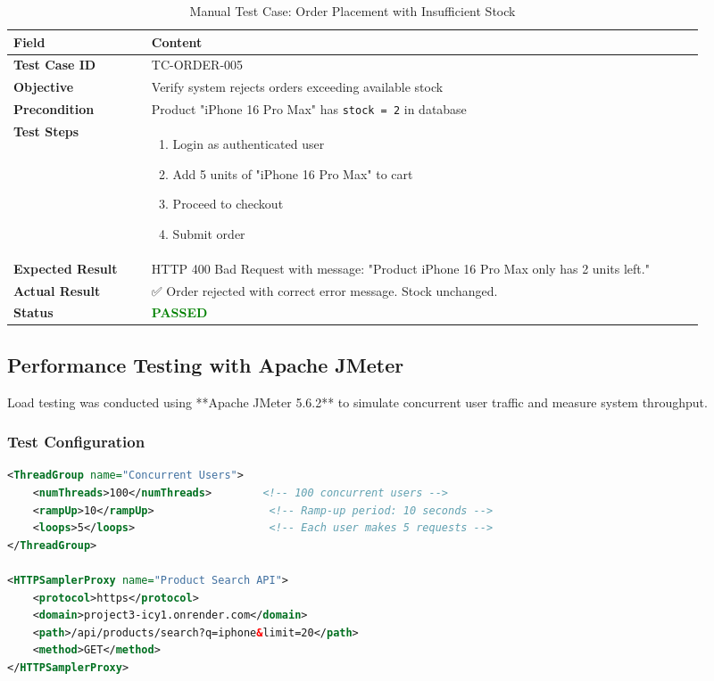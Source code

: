 \begin{table}[H]
\centering
\caption{Manual Test Case: Order Placement with Insufficient Stock}
\label{tab:test_stock}
\small
\begin{tabular}{@{}p{0.18\linewidth}p{0.72\linewidth}@{}}
\toprule
\textbf{Field} & \textbf{Content} \\
\midrule
\textbf{Test Case ID} & TC-ORDER-005 \\
\textbf{Objective} & Verify system rejects orders exceeding available stock \\
\textbf{Precondition} & Product "iPhone 16 Pro Max" has \texttt{stock = 2} in database \\
\textbf{Test Steps} & 
\begin{minipage}[t]{\linewidth}
\begin{enumerate}[nosep,leftmargin=*]
    \item Login as authenticated user
    \item Add 5 units of "iPhone 16 Pro Max" to cart
    \item Proceed to checkout
    \item Submit order
\end{enumerate}
\end{minipage} \\
\textbf{Expected Result} & HTTP 400 Bad Request with message: "Product iPhone 16 Pro Max only has 2 units left." \\
\textbf{Actual Result} & ✅ Order rejected with correct error message. Stock unchanged. \\
\textbf{Status} & \textcolor{green}{\textbf{PASSED}} \\
\bottomrule
\end{tabular}
\end{table}

\subsection{Performance Testing with Apache JMeter}

Load testing was conducted using **Apache JMeter 5.6.2** to simulate concurrent user traffic and measure system throughput.

\subsubsection{Test Configuration}

\begin{lstlisting}[language=XML, caption=JMeter Test Plan Configuration]
<ThreadGroup name="Concurrent Users">
    <numThreads>100</numThreads>        <!-- 100 concurrent users -->
    <rampUp>10</rampUp>                  <!-- Ramp-up period: 10 seconds -->
    <loops>5</loops>                     <!-- Each user makes 5 requests -->
</ThreadGroup>

<HTTPSamplerProxy name="Product Search API">
    <protocol>https</protocol>
    <domain>project3-icy1.onrender.com</domain>
    <path>/api/products/search?q=iphone&limit=20</path>
    <method>GET</method>
</HTTPSamplerProxy>
\end{lstlisting}

